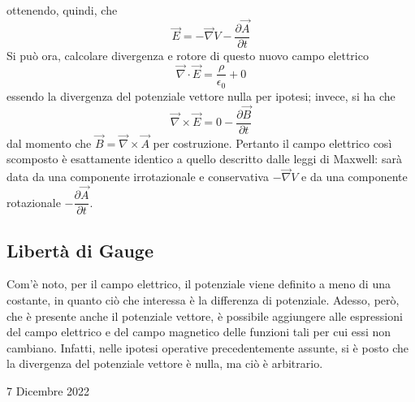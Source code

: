 \documentclass[a4paper]{extarticle}
\begin{document}
ottenendo, quindi, che
\[\vec E = - \vec \nabla V - \frac{\partial \vec A}{\partial t}\]
Si può ora, calcolare divergenza e rotore di questo nuovo campo elettrico
\[\vec \nabla \cdot \vec E = \frac{\rho}{\epsilon_0} + 0\]
essendo la divergenza del potenziale vettore nulla per ipotesi; invece, si ha che
\[\vec \nabla \times \vec E = 0 - \frac{\partial \vec B}{\partial t}\]
dal momento che $\vec B = \vec \nabla \times \vec A$ per costruzione. Pertanto il campo elettrico così scomposto è esattamente identico a quello descritto dalle leggi di Maxwell: sarà data da una componente irrotazionale e conservativa $-\vec \nabla V$ e da una componente rotazionale $-\dfrac{\partial \vec A}{\partial t}$.

\vspace{1em}
\noindent
\subsection{Libertà di Gauge}
Com'è noto, per il campo elettrico, il potenziale viene definito a meno di una costante, in quanto ciò che interessa è la differenza di potenziale. Adesso, però, che è presente anche il potenziale vettore, è possibile aggiungere alle espressioni del campo elettrico e del campo magnetico delle funzioni tali per cui essi non cambiano. Infatti, nelle ipotesi operative precedentemente assunte, si è posto che la divergenza del potenziale vettore è nulla, ma ciò è arbitrario.

\newpage
\noindent
\begin{center}
  7 Dicembre 2022
\end{center}
\end{document}
